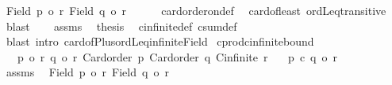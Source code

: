 \begin{isabellebody}
\ {\isachardoublequoteopen}{\isacharbar}{\kern0pt}Field\ p{\isacharbar}{\kern0pt}\ {\isasymle}o\ r{\isachardoublequoteclose}\ {\isachardoublequoteopen}{\isacharbar}{\kern0pt}Field\ q{\isacharbar}{\kern0pt}\ {\isasymle}o\ r{\isachardoublequoteclose}\isanewline
\ \ \ \ \isamarkupfalse%
\ card{\isacharunderscore}{\kern0pt}order{\isacharunderscore}{\kern0pt}on{\isacharunderscore}{\kern0pt}def\ \isamarkupfalse%
\ card{\isacharunderscore}{\kern0pt}of{\isacharunderscore}{\kern0pt}least\ ordLeq{\isacharunderscore}{\kern0pt}transitive\ \isamarkupfalse%
\ blast{\isacharplus}{\kern0pt}\isanewline
\ \ \isamarkupfalse%
\ assms\ \isamarkupfalse%
\ {\isacharquery}{\kern0pt}thesis\ \isamarkupfalse%
\ cinfinite{\isacharunderscore}{\kern0pt}def\ csum{\isacharunderscore}{\kern0pt}def\isanewline
\ \ \ \ \isamarkupfalse%
\ {\isacharparenleft}{\kern0pt}blast\ intro{\isacharcolon}{\kern0pt}\ card{\isacharunderscore}{\kern0pt}of{\isacharunderscore}{\kern0pt}Plus{\isacharunderscore}{\kern0pt}ordLeq{\isacharunderscore}{\kern0pt}infinite{\isacharunderscore}{\kern0pt}Field{\isacharparenright}{\kern0pt}\isanewline
{}\isamarkupfalse%
%
\endisatagproof
{\isafoldproof}%
%
\isadelimproof
\isanewline
%
\endisadelimproof
\isanewline
{}\isamarkupfalse%
\ cprod{\isacharunderscore}{\kern0pt}cinfinite{\isacharunderscore}{\kern0pt}bound{\isacharcolon}{\kern0pt}\isanewline
\ \ \ {\isachardoublequoteopen}p\ {\isasymle}o\ r{\isachardoublequoteclose}\ {\isachardoublequoteopen}q\ {\isasymle}o\ r{\isachardoublequoteclose}\ {\isachardoublequoteopen}Card{\isacharunderscore}{\kern0pt}order\ p{\isachardoublequoteclose}\ {\isachardoublequoteopen}Card{\isacharunderscore}{\kern0pt}order\ q{\isachardoublequoteclose}\ {\isachardoublequoteopen}Cinfinite\ r{\isachardoublequoteclose}\isanewline
\ \ \ {\isachardoublequoteopen}p\ {\isacharasterisk}{\kern0pt}c\ q\ {\isasymle}o\ r{\isachardoublequoteclose}\isanewline
%
\isadelimproof
%
\endisadelimproof
%
\isatagproof
{}\isamarkupfalse%
\ {\isacharminus}{\kern0pt}\isanewline
\ \ \isamarkupfalse%
\ assms{\isacharparenleft}{\kern0pt}{}{\isacharminus}{\kern0pt}{}{\isacharparenright}{\kern0pt}\ \isamarkupfalse%
\ {\isachardoublequoteopen}{\isacharbar}{\kern0pt}Field\ p{\isacharbar}{\kern0pt}\ {\isasymle}o\ r{\isachardoublequoteclose}\ {\isachardoublequoteopen}{\isacharbar}{\kern0pt}Field\ q{\isacharbar}{\kern0pt}\ {\isasymle}o\ r{\isachardoublequoteclose}\isanewline

\end{isabellebody}
